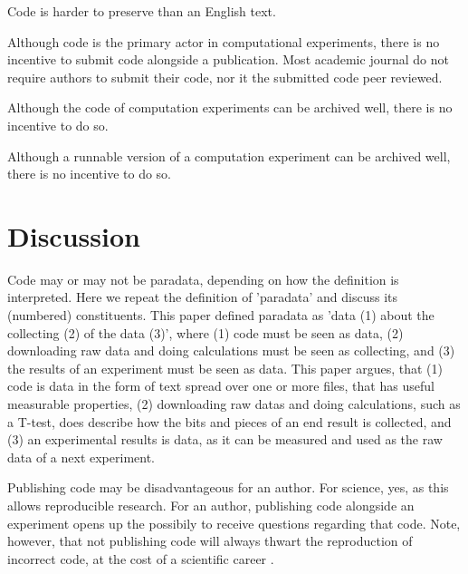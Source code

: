 Code is harder to preserve than an English text.

Although code is the primary actor in computational experiments,
there is no incentive to submit code alongside a publication.
Most academic journal do not require authors to submit their code,
nor it the submitted code peer reviewed.

Although the code of computation experiments can be archived well, 
there is no incentive to do so.

Although a runnable version of a computation experiment can be archived well, 
there is no incentive to do so.

\section{Discussion}


Code may or may not be paradata, depending on how the definition
is interpreted.
Here we repeat the definition of 'paradata' and discuss 
its (numbered) constituents.
This paper defined paradata as 'data (1) about the collecting (2) of the data (3)',
where (1) code must be seen as data, (2) downloading raw data
and doing calculations must be seen as collecting, and (3) the
results of an experiment must be seen as data.
This paper argues, that (1) code is data in the form of text spread
over one or more files, that has useful measurable properties, 
(2) downloading raw datas and doing calculations, such as a T-test,
does describe how the bits and pieces of an end result is collected,
and (3) an experimental results is data, as it can be measured and
used as the raw data of a next experiment.


Publishing code may be disadvantageous for an author.
For science, yes, as this allows reproducible research.
For an author, publishing code alongside an experiment opens up
the possibily to receive questions regarding that code.
Note, however, that not publishing code will always thwart
the reproduction of incorrect code, at the cost of a scientific
career \cite{baggerly2009deriving}.


